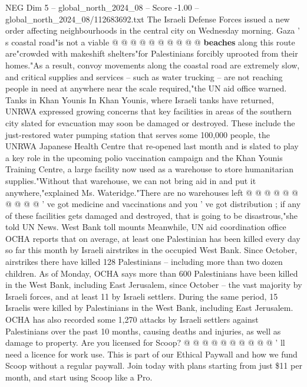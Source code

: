 \begin{textsample}{NEG Dim 5 – global\_north\_2024\_08 – Score -1.00 – global\_north\_2024\_08/112683692.txt}
The Israeli Defense Forces issued a new order affecting neighbourhoods in the central city on Wednesday morning.
Gaza ' s coastal road"is not a viable @ @ @ @ @ @ @ @ @ @ \textbf{beaches} along this route are"crowded with makeshift shelters"for Palestinians forcibly uprooted from their homes."As a result, convoy movements along the coastal road are extremely slow, and critical supplies and services -- such as water trucking -- are not reaching people in need at anywhere near the scale required,"the UN aid office warned.
Tanks in Khan Younis In Khan Younis, where Israeli tanks have returned, UNRWA expressed growing concerns that key facilities in areas of the southern city slated for evacuation may soon be damaged or destroyed.
These include the just-restored water pumping station that serves some 100,000 people, the UNRWA Japanese Health Centre that re-opened last month and is slated to play a key role in the upcoming polio vaccination campaign and the Khan Younis Training Centre, a large facility now used as a warehouse to store humanitarian supplies."Without that warehouse, we can not bring aid in and put it anywhere,"explained Ms.
Wateridge."There are no warehouses left @ @ @ @ @ @ @ @ @ @ ' ve got medicine and vaccinations and you ' ve got distribution ; if any of these facilities gets damaged and destroyed, that is going to be disastrous,"she told UN News.
West Bank toll mounts Meanwhile, UN aid coordination office OCHA reports that on average, at least one Palestinian has been killed every day so far this month by Israeli airstrikes in the occupied West Bank.
Since October, airstrikes there have killed 128 Palestinians -- including more than two dozen children.
As of Monday, OCHA says more than 600 Palestinians have been killed in the West Bank, including East Jerusalem, since October -- the vast majority by Israeli forces, and at least 11 by Israeli settlers.
During the same period, 15 Israelis were killed by Palestinians in the West Bank, including East Jerusalem.
OCHA has also recorded some 1,270 attacks by Israeli settlers against Palestinians over the past 10 months, causing deaths and injuries, as well as damage to property.
Are you licensed for Scoop? @ @ @ @ @ @ @ @ @ @ ' ll need a licence for work use.
This is part of our Ethical Paywall and how we fund Scoop without a regular paywall.
Join today with plans starting from just \$11 per month, and start using Scoop like a Pro.

\end{textsample}
